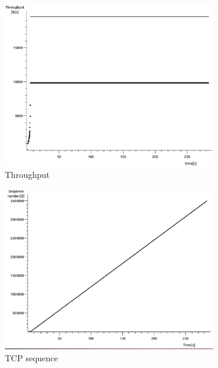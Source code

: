 \documentclass[conference,a4paper]{../../sty/IEEEtran}
\begin{document}
\begin{figure}
 \centering
 \begin{subfigure}[b]{0.2\textwidth}
  \includegraphics[width=\textwidth]{s7-2_th}
  \caption{Throughput}
 \end{subfigure}
 \begin{subfigure}[b]{0.2\textwidth}
  \includegraphics[width=\textwidth]{s7-2_seq}
  \caption{TCP sequence}
 \end{subfigure}
 \begin{subfigure}[b]{0.2\textwidth}

\end{subfigure}
\end{figure}
\end{document}
